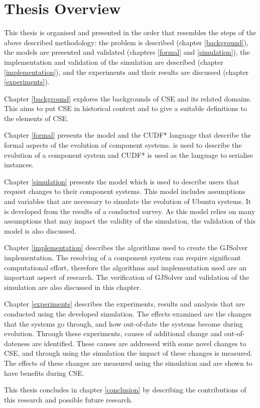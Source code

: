 \section{Thesis Overview}
This thesis is organised and presented in the order that resembles the steps of the above described methodology:
the problem is described (chapter \ref{background}), the models are presented and validated (chapters \ref{formal} and \ref{simulation}),
the implementation and validation of the simulation are described (chapter \ref{implementation}), and the experiments and their results are discussed (chapter \ref{experiments}).  

Chapter \ref{background} explores the backgrounds of CSE and its related domains.
This aims to put CSE in historical context and to give a suitable definitions to the elements of CSE.

Chapter \ref{formal} presents the \modelname model and the CUDF* language that describe the formal aspects of the evolution of component systems.
\modelname is used to describe the evolution of a component system and CUDF* is used as the language to serialise \modelname instances.

Chapter \ref{simulation} presents the \usermodel model which is used to describe users that request changes to their component systems.
This model includes assumptions and variables that are necessary to simulate the evolution of Ubuntu systems. 
It is developed from the results of a conducted survey.
As this model relies on many assumptions that may impact the validity of the simulation, the validation of this model is also discussed. 

Chapter \ref{implementation} describes the algorithms used to create the GJSolver implementation.
The resolving of a component system can require significant computational effort,
therefore the algorithms and implementation used are an important aspect of research.
The verification of GJSolver and validation of the simulation are also discussed in this chapter.

Chapter \ref{experiments} describes the experiments, results and analysis that are conducted using the developed simulation.
The effects examined are the changes that the systems go through, and how out-of-date the systems become during evolution.
Through these experiments, causes of additional change and out-of-dateness are identified.
These causes are addressed with some novel changes to CSE, and through using the simulation the impact of these changes is measured.
The effects of these changes are measured using the simulation and are shown to have benefits during CSE.

This thesis concludes in chapter \ref{conclusion} by describing the contributions of this research and possible future research.
